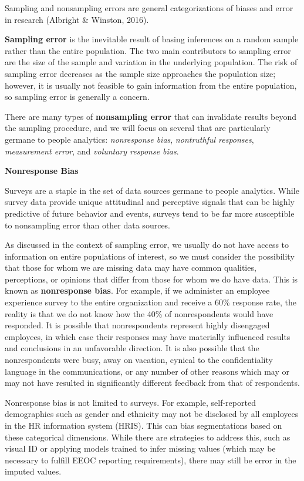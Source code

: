 \documentclass[]{book}
\begin{document}
Sampling and nonsampling errors are general categorizations of biases and error in research (Albright \& Winston, 2016).

\textbf{Sampling error} is the inevitable result of basing inferences on a random sample rather than the entire population. The two main contributors to sampling error are the size of the sample and variation in the underlying population. The risk of sampling error decreases as the sample size approaches the population size; however, it is usually not feasible to gain information from the entire population, so sampling error is generally a concern.

There are many types of \textbf{nonsampling error} that can invalidate results beyond the sampling procedure, and we will focus on several that are particularly germane to people analytics: \emph{nonresponse bias}, \emph{nontruthful responses}, \emph{measurement error}, and \emph{voluntary response bias}.

\textbf{Nonresponse Bias}

Surveys are a staple in the set of data sources germane to people analytics. While survey data provide unique attitudinal and perceptive signals that can be highly predictive of future behavior and events, surveys tend to be far more susceptible to nonsampling error than other data sources.

As discussed in the context of sampling error, we usually do not have access to information on entire populations of interest, so we must consider the possibility that those for whom we are missing data may have common qualities, perceptions, or opinions that differ from those for whom we do have data. This is known as \textbf{nonresponse bias}. For example, if we administer an employee experience survey to the entire organization and receive a 60\% response rate, the reality is that we do not know how the 40\% of nonrespondents would have responded. It is possible that nonrespondents represent highly disengaged employees, in which case their responses may have materially influenced results and conclusions in an unfavorable direction. It is also possible that the nonrespondents were busy, away on vacation, cynical to the confidentiality language in the communications, or any number of other reasons which may or may not have resulted in significantly different feedback from that of respondents.

Nonresponse bias is not limited to surveys. For example, self-reported demographics such as gender and ethnicity may not be disclosed by all employees in the HR information system (HRIS). This can bias segmentations based on these categorical dimensions. While there are strategies to address this, such as visual ID or applying models trained to infer missing values (which may be necessary to fulfill EEOC reporting requirements), there may still be error in the imputed values.
\end{document}
